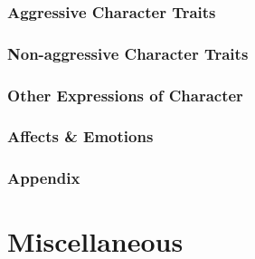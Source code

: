 \documentclass{article}
\begin{document}
\subsubsection{Aggressive Character Traits}

\subsubsection{Non-aggressive Character Traits}

\subsubsection{Other Expressions of Character}

\subsubsection{Affects \& Emotions}

\subsubsection{Appendix}


\section{Miscellaneous}


\printbibliography[heading=bibintoc]
	
\end{document}
